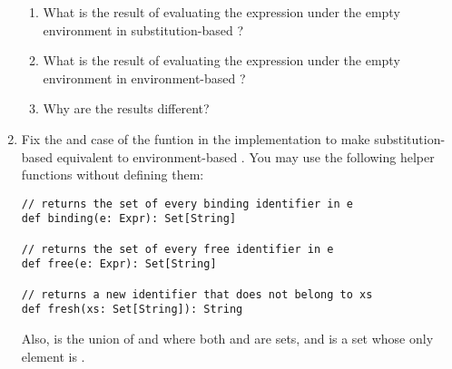 \begin{exercise}
\begin{enumerate}
\begin{enumerate}
\item What is the result of evaluating the expression under the empty
  environment in substitution-based \lang?
\item What is the result of evaluating the expression under the empty
  environment in environment-based \lang?
\item Why are the results different?
\end{enumerate}

  \item Fix the  and  case of the funtion  in the
    implementation to make substitution-based \lang equivalent to
    environment-based \lang.  You may use the following helper functions
    without defining them:

\begin{verbatim}
// returns the set of every binding identifier in e
def binding(e: Expr): Set[String]

// returns the set of every free identifier in e
def free(e: Expr): Set[String]

// returns a new identifier that does not belong to xs
def fresh(xs: Set[String]): String
\end{verbatim}

    Also,  is the union of  and  where both
     and  are sets, and  is a set whose only
    element is .

\end{enumerate}

\end{exercise}

